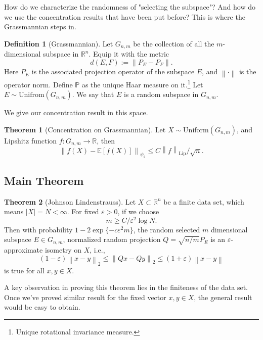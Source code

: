\documentclass[9pt,onesided]{article}
\newcommand{\nm}[1]{\left\lVert#1\right\rVert}
\newcommand{\re}{\mathbb{R}}
\newcommand{\ex}[1]{\mathbb{E}[#1]}
\newcommand{\mc}{\color{BlueViolet}}
\renewcommand{\ge}{\geqslant}
\renewcommand{\le}{\leqslant}
\newcommand{\p}{\mathbb{P}}
\theoremstyle{definition}
\newtheorem{definition}{\mc Definition}
\newtheorem{theorem}{\mc Theorem}
\begin{document}
How do we characterize the randomness of "selecting the subspace"? And how do we use the concentration results that have been put before? This is where the Grassmannian steps in.

\begin{definition}
[Grassmannian] Let $G_{n,m}$ be the collection of all the $m$-dimensional subspace in $\re^n$. Equip it with the metric
\begin{equation*}
    d(E,F):=\nm{P_E- P_F}.
\end{equation*}
Here $P_E$ is the associated projection operator of the subspace $E$, and $\nm{\cdot}$ is the operator norm. Define $\p$ as the unique Haar measure on it.\footnote{Unique rotational invariance measure.} Let $E\sim \mathrm{Unifrom}(G_{n,m})$. We say that $E$ is a random subspace in $ G_{n,m}$.
\end{definition}
We give our concentration result in this space.
\begin{theorem}
[Concentration on Grassmannian] Let $X\sim \mathrm{Uniform}(G_{n,m})$, and Lipshitz function $f:G_{n,m}\to \re$, then
\begin{equation*}
    \nm{f(X)-\ex{f(X)}}_{\psi_2}\le C\nm{f}_{\mathrm{Lip}}/\sqrt{n}.
\end{equation*}
\end{theorem}

\subsection{Main Theorem}

\begin{theorem}
[Johnson Lindenstrauss] Let $X\subset\re^n$ be a finite data set, which means $|X|=N<\infty$. For fixed $\varepsilon>0$, if we choose
\begin{equation*}
    m\ge C/\varepsilon^2 \log N.
\end{equation*}
 Then with probability $1-2\exp\{-c\varepsilon^2m\}$, the random selected $m$ dimensional subspace $E\in G_{n,m}$, normalized random projection $Q= \sqrt{n/m} P_E$ is an $\varepsilon$-approximate isometry on $X$, i.e., 
 \begin{equation*}
    (1-\varepsilon)\nm{x-y}_{2}\le \nm{Qx-Qy}_2 \le(1+\varepsilon)\nm{x-y}
 \end{equation*}
is true for all $x,y\in X$.
\end{theorem}
A key observation in proving this theorem lies in the finiteness of the data set. Once we've proved similar result for the fixed vector $x,y\in X$, the general result would be easy to obtain.
\end{document}

